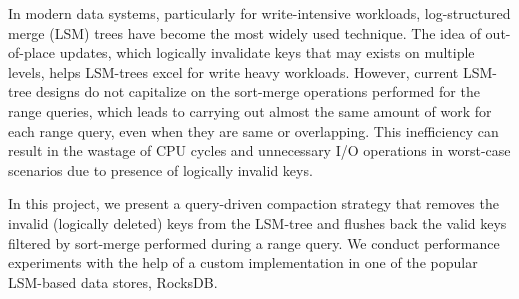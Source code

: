 In modern data systems, particularly for write-intensive workloads, log-structured merge (LSM) trees have become the most 
widely used technique. The idea of out-of-place updates, which logically 
invalidate keys that may exists on multiple levels, helps LSM-trees excel for write heavy workloads. However, current 
LSM-tree designs do not capitalize on the sort-merge operations performed for the range queries, which leads to carrying 
out almost the same amount of work for each range query, even when they are same or overlapping. This inefficiency can 
result in the wastage of CPU cycles and unnecessary I/O operations in worst-case scenarios due to presence of logically 
invalid keys.

In this project, we present a query-driven compaction strategy that removes the invalid (logically deleted) keys from the 
LSM-tree and flushes back the valid keys filtered by sort-merge performed during a range query. We conduct performance 
experiments with the help of a custom implementation in one of the popular LSM-based data stores, RocksDB.
